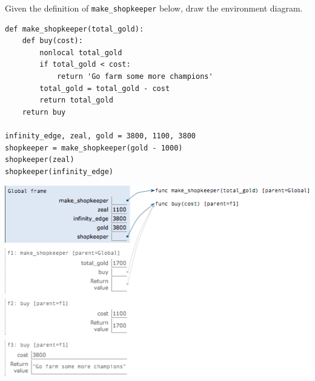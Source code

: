 \question Given the definition of {\tt make\_shopkeeper} below, draw the
environment diagram.
\begin{lstlisting}
def make_shopkeeper(total_gold):
    def buy(cost):
        nonlocal total_gold
        if total_gold < cost:
            return 'Go farm some more champions'
        total_gold = total_gold - cost
        return total_gold
    return buy

infinity_edge, zeal, gold = 3800, 1100, 3800
shopkeeper = make_shopkeeper(gold - 1000)
shopkeeper(zeal)
shopkeeper(infinity_edge)
\end{lstlisting}

\begin{solution}[4.0in]
\begin{center}
\includegraphics{make-shopkeeper.png}
\end{center}
\end{solution}
